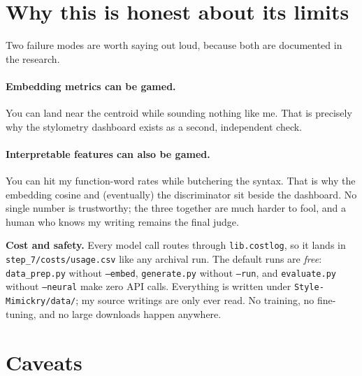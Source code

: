 \documentclass[11pt]{article}
\newcommand{\code}[1]{\texttt{#1}}
\begin{document}
\section{Why this is honest about its limits}

Two failure modes are worth saying out loud, because both are documented in the research.

\paragraph{Embedding metrics can be gamed.} You can land near the centroid while sounding nothing
like me. That is precisely why the stylometry dashboard exists as a second, independent check.

\paragraph{Interpretable features can also be gamed.} You can hit my function-word rates while
butchering the syntax. That is why the embedding cosine and (eventually) the discriminator sit beside
the dashboard. No single number is trustworthy; the three together are much harder to fool, and a
human who knows my writing remains the final judge.

\medskip
\noindent\textbf{Cost and safety.} Every model call routes through \code{lib.costlog}, so it lands in
\code{step\_7/costs/usage.csv} like any archival run. The default runs are \emph{free}:
\code{data\_prep.py} without \code{--embed}, \code{generate.py} without \code{--run}, and
\code{evaluate.py} without \code{--neural} make zero API calls. Everything is written under
\code{Style-Mimickry/data/}; my source writings are only ever read. No training, no fine-tuning, and
no large downloads happen anywhere.

\section{Caveats}
\end{document}
